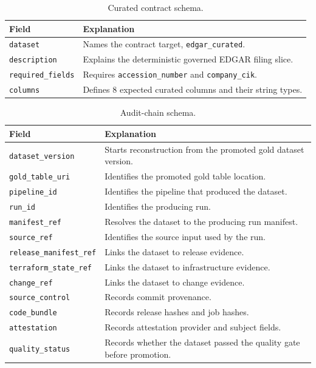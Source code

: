 \begin{table}[H]
  \centering
  \caption{Curated contract schema.}
  \label{tab:schema-curated-contract}
  \renewcommand{\arraystretch}{1.12}
  \begin{tabularx}{\textwidth}{@{}p{}X@{}}
    \toprule
    \textbf{Field} & \textbf{Explanation} \\
    \midrule
    \texttt{dataset} & Names the contract target, \texttt{edgar\_curated}. \\
    \texttt{description} & Explains the deterministic governed EDGAR filing slice. \\
    \texttt{required\_fields} & Requires \texttt{accession\_number} and \texttt{company\_cik}. \\
    \texttt{columns} & Defines 8 expected curated columns and their string types. \\
    \bottomrule
  \end{tabularx}
\end{table}

\begin{table}[H]
  \centering
  \caption{Audit-chain schema.}
  \label{tab:schema-audit-chain}
  \renewcommand{\arraystretch}{1.12}
  \begin{tabularx}{\textwidth}{@{}p{}X@{}}
    \toprule
    \textbf{Field} & \textbf{Explanation} \\
    \midrule
    \texttt{dataset\_version} & Starts reconstruction from the promoted gold dataset version. \\
    \texttt{gold\_table\_uri} & Identifies the promoted gold table location. \\
    \texttt{pipeline\_id} & Identifies the pipeline that produced the dataset. \\
    \texttt{run\_id} & Identifies the producing run. \\
    \texttt{manifest\_ref} & Resolves the dataset to the producing run manifest. \\
    \texttt{source\_ref} & Identifies the source input used by the run. \\
    \texttt{release\_manifest\_ref} & Links the dataset to release evidence. \\
    \texttt{terraform\_state\_ref} & Links the dataset to infrastructure evidence. \\
    \texttt{change\_ref} & Links the dataset to change evidence. \\
    \texttt{source\_control} & Records commit provenance. \\
    \texttt{code\_bundle} & Records release hashes and job hashes. \\
    \texttt{attestation} & Records attestation provider and subject fields. \\
    \texttt{quality\_status} & Records whether the dataset passed the quality gate before promotion. \\
    \bottomrule
  \end{tabularx}
\end{table}

